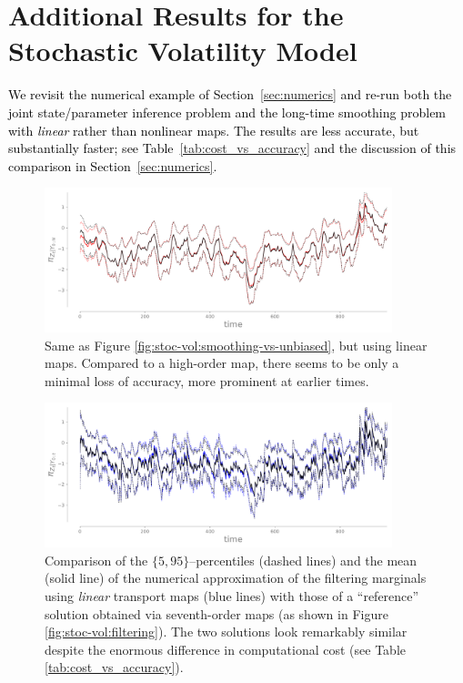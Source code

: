 \documentclass[twoside,11pt]{article}
\newcommand{\hrevone}{\textcolor{black} }
\begin{document}
%
\section{Additional Results for the Stochastic Volatility Model}
\label{sec:add_res}
%
%
%
%
%
%
%
%
%
%
%
%
%
%
%

\hrevone{We revisit the numerical example of Section~\ref{sec:numerics} and
re-run both the joint state\slash parameter inference problem and the
long-time smoothing problem with \textit{linear} rather than
nonlinear maps. The results are less accurate, but substantially
faster; see Table~\ref{tab:cost_vs_accuracy} and the discussion of
this comparison in Section~\ref{sec:numerics}.}

\begin{figure}[H]
  \centering
  \includegraphics[width=0.90\textwidth, bb=25bp 0bp 750bp 325bp, clip]{o1-smoothing-marginals-vs-unbiased-timesteps.pdf}
  \caption{
    Same as Figure \ref{fig:stoc-vol:smoothing-vs-unbiased}, but using linear maps.
    Compared to a high-order map, there seems to be only a 
    minimal loss of accuracy, more
    prominent at earlier times.
  }
  \label{fig:stoc-vol:smoothing-vs-unbiased-linear}
\end{figure}

\begin{figure}[H]
  \centering
  \includegraphics[width=0.90\textwidth, bb=25bp 0bp 750bp 325bp, clip]{o1-filtering-marginals-timesteps.pdf}
  \caption{ Comparison of the $\{5,95\}$--percentiles (dashed lines) and the mean (solid line)
      of the numerical approximation of the
      filtering marginals using {\it linear} transport maps
      (blue lines) with those of a ``reference'' solution obtained
      via seventh-order maps (as shown in Figure \ref{fig:stoc-vol:filtering}).
      The two solutions look remarkably similar despite
      the enormous difference in computational cost (see Table \ref{tab:cost_vs_accuracy}).
  }
  \label{fig:stoc-vol:filtering-vs-unbiased-linear}
\end{figure}
\end{document}
